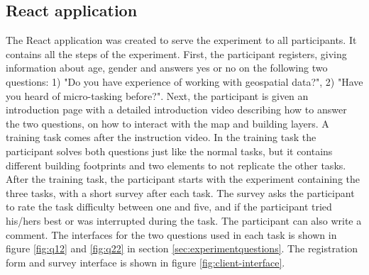 \subsection{React application}
The React application was created to serve the experiment to all participants. It contains all the steps of the experiment. First, the participant registers, giving information about age, gender and answers yes or no on the following two questions: 1) "Do you have experience of working with geospatial data?", 2) "Have you heard of micro-tasking before?". Next, the participant is given an introduction page with a detailed introduction video describing how to answer the two questions, on how to interact with the map and building layers. A training task comes after the instruction video. In the training task the participant solves both questions just like the normal tasks, but it contains different building footprints and two elements to not replicate the other tasks. After the training task, the participant starts with the experiment containing the three tasks, with a short survey after each task. The survey asks the participant to rate the task difficulty between one and five, and if the participant tried his/hers best or was interrupted during the task. The participant can also write a comment. The interfaces for the two questions used in each task is shown in figure \ref{fig:q12} and \ref{fig:q22} in section \ref{sec:experimentquestions}. The registration form and survey interface is shown in figure \ref{fig:client-interface}. 

